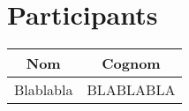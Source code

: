 \section{Participants}

\begin{center}
\begin{tabular}{|c|c|}
\hline
{\cellcolor[gray]{.8} \bf Nom} & {\cellcolor[gray]{.8} \bf Cognom}  \\
\hline
Blablabla & BLABLABLA \\
\hline
\end{tabular}
\end{center}

